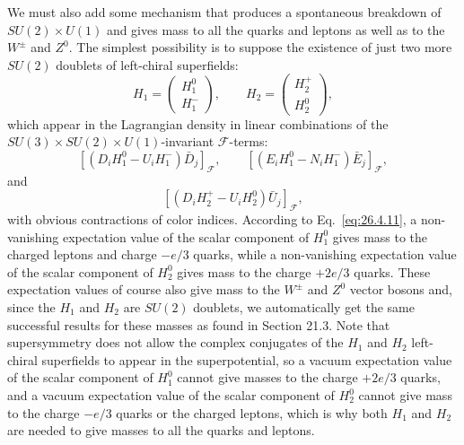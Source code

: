 We must also add some mechanism that produces a spontaneous breakdown
of \(SU(2)\times U(1)\) and gives mass to all the quarks and
leptons as well as to the \(W^\pm\) and \(Z^0\). The simplest possibility
is to suppose the existence of just two more \(SU(2)\) doublets of
left-chiral superfields:
\begin{equation}
  H_1=
  \begin{pmatrix}
    H_1^0\\
    H_1^-
  \end{pmatrix},
  \qquad
  H_2=
  \begin{pmatrix}
    H_2^+\\
    H_2^0
  \end{pmatrix},
  \tag{28.1.1}\label{eq:28.1.1}
\end{equation}
which appear in the Lagrangian density in linear combinations of the
\(SU(3)\times SU(2)\times U(1)\)-invariant
\(\mathcal{F}\)-terms:
\begin{equation}
  \left[(D_iH_1^0-U_iH_1^-)\bar D_j\right]_{\mathcal{F}},
  \qquad
  \left[(E_iH_1^0-N_iH_1^-)\bar E_j\right]_{\mathcal{F}},
  \tag{28.1.2}\label{eq:28.1.2}
\end{equation}
and
\begin{equation}
  \left[(D_iH_2^+-U_iH_2^0)\bar U_j\right]_{\mathcal{F}},
  \tag{28.1.3}\label{eq:28.1.3}
\end{equation}
with obvious contractions of color indices. According to
Eq.~\eqref{eq:26.4.11}, a non-vanishing expectation value of the scalar
component of \(H_1^0\) gives mass to the charged leptons and charge
\(-e/3\) quarks, while a non-vanishing expectation value of the scalar
component of \(H_2^0\) gives mass to the charge \(+2e/3\) quarks. These
expectation values of course also give mass to the \(W^\pm\) and \(Z^0\)
vector bosons and, since the \(H_1\) and \(H_2\) are \(SU(2)\) doublets,
we automatically get the same successful results for these masses as
found in Section 21.3. Note that supersymmetry does not allow the complex
conjugates of the \(H_1\) and \(H_2\) left-chiral superfields to appear
in the superpotential, so a vacuum expectation value of the scalar
component of \(H_1^0\) cannot give masses to the charge \(+2e/3\) quarks,
and a vacuum expectation value of the scalar component of \(H_2^0\)
cannot give mass to the charge \(-e/3\) quarks or the charged leptons,
which is why both \(H_1\) and \(H_2\) are needed to give masses to all the
quarks and leptons.

